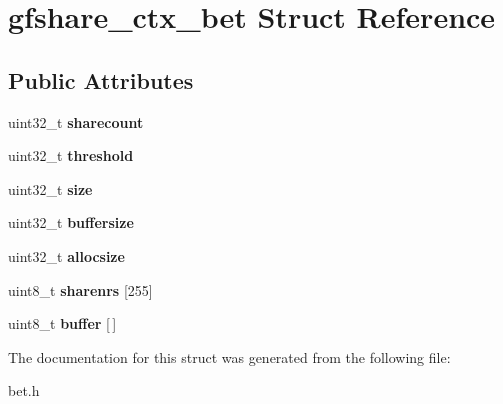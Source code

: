 \hypertarget{structgfshare__ctx__bet}{}\section{gfshare\+\_\+ctx\+\_\+bet Struct Reference}
\label{structgfshare__ctx__bet}
\subsection*{Public Attributes}
\begin{DoxyCompactItemize}
\item 
\mbox{\label{structgfshare__ctx__bet_a4c765415b8d842a92c6644b59e036a3f}} 
uint32\+\_\+t {\bfseries sharecount}
\item 
\mbox{\label{structgfshare__ctx__bet_ae63c84f60d45927b32f01ee03bc75bb8}} 
uint32\+\_\+t {\bfseries threshold}
\item 
\mbox{\label{structgfshare__ctx__bet_aadffa692ab06b96d49f1e38024707a03}} 
uint32\+\_\+t {\bfseries size}
\item 
\mbox{\label{structgfshare__ctx__bet_a6d3cec2d48e3a5530f2fb955085487d0}} 
uint32\+\_\+t {\bfseries buffersize}
\item 
\mbox{\label{structgfshare__ctx__bet_a8ae395c7d798dfc19764f0ccdbe8e405}} 
uint32\+\_\+t {\bfseries allocsize}
\item 
\mbox{\label{structgfshare__ctx__bet_a93046b5752b076392fbc010cf97bec2c}} 
uint8\+\_\+t {\bfseries sharenrs} \mbox{[}255\mbox{]}
\item 
\mbox{\label{structgfshare__ctx__bet_a14d97810d00ad0a397b006c3b32eb4b5}} 
uint8\+\_\+t {\bfseries buffer} \mbox{[}$\,$\mbox{]}
\end{DoxyCompactItemize}


The documentation for this struct was generated from the following file\+:\begin{DoxyCompactItemize}
\item 
bet.\+h\end{DoxyCompactItemize}
